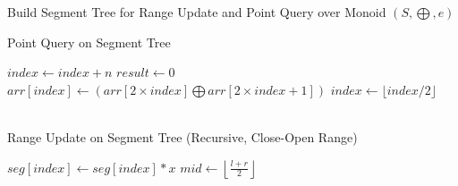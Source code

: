 \begin{algorithm}
    \caption{Build Segment Tree for Range Update and Point Query over Monoid \((S, \bigoplus, e)\)}
    \begin{algorithmic}[1]
            \caption{Point Query on Segment Tree }
                \State $index \gets index + n$ 
                \State $result \gets 0$ 
                    \State $arr[index] \gets (arr[2 \times index] \bigoplus arr[2 \times index + 1])$
                    \State $index \gets \lfloor index / 2 \rfloor$
                \EndWhile
            \EndProcedure

        \\

        \caption{Range Update on Segment Tree (Recursive, Close-Open Range)}
                    \State \Return
                    \State $seg[index] \gets seg[index] \ast x$
                \Else
                    \State $mid \gets \left\lfloor \frac{l + r}{2} \right\rfloor$
                    \State {}
                    \State {}
                    \State \Return
                \EndIf
            \EndProcedure

    \end{algorithmic}
\end{algorithm}
